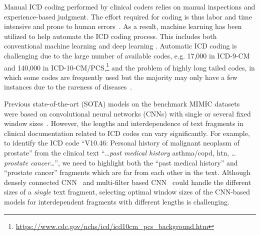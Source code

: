 \documentclass{article}
\begin{document}
Manual ICD coding performed by clinical coders relies on manual inspections and
experience-based judgment. The effort required for coding is thus
labor and time intensive and prone to human errors~\cite{o2005measuring,nguyen2018computer}. As a result, machine learning has been utilized to help automate the ICD coding process.
This includes both conventional machine learning \cite{perotte2013diagnosis,koopman2015automatic} and deep learning \cite{karimi2017automatic,prakash2017condensed,baumel2018multi,mullenbach2018,wang2018joint,song2019generalized,xie2019ehr,li2020multirescnn}. Automatic ICD coding is challenging due to the large number of available codes, e.g. 17,000 in ICD-9-CM and 140,000 in ICD-10-CM/PCS,\footnote{\url{https://www.cdc.gov/nchs/icd/icd10cm_pcs_background.htm}} and the problem of highly long tailed codes, in which some codes are frequently used but the majority may only have a few instances due to the rareness of diseases~\cite{song2019generalized,xie2019ehr}. 



Previous state-of-the-art (SOTA) models on the benchmark MIMIC datasets~\cite{lee2011open,johnson2016mimic} were based on convolutional neural networks (CNNs) with single or several fixed window sizes~\cite{mullenbach2018,xie2019ehr,li2020multirescnn}.  However, 
the lengths and interdependence of text fragments in clinical documentation related to ICD codes can vary significantly. For example, to identify the ICD code ``V10.46: Personal history of malignant neoplasm of prostate'' from the clinical text ``\ldots\emph{past medical history} asthma/copd, htn, \ldots \emph{prostate cancer}\ldots'', we need to highlight both the ``past medical history'' and ``prostate cancer'' fragments which are far from each other in the text. Although densely connected CNN~\cite{xie2019ehr} and multi-filter based CNN~\cite{li2020multirescnn} could handle the different sizes of a \emph{single} text fragment, selecting optimal window sizes of the CNN-based models for interdependent fragments with different lengths is \mbox{challenging}.
\end{document}
